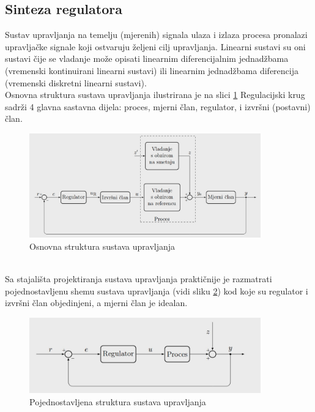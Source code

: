 \documentclass[times, utf8, diplomski]{fer}
\begin{document}
\subsection{Sinteza regulatora}
Sustav upravljanja na temelju (mjerenih) signala ulaza i izlaza procesa pronalazi upravljačke signale koji ostvaruju željeni cilj upravljanja. Linearni sustavi su oni sustavi čije se vladanje može opisati linearnim diferencijalnim jednadžbama (vremenski kontinuirani linearni sustavi) ili linearnim jednadžbama diferencija (vremenski diskretni linearni sustavi).\\
Osnovna struktura sustava upravljanja ilustrirana je na slici \ref{fig:Osnovna struktura} Regulacijski krug sadrži 4 glavna sastavna dijela: proces, mjerni član, regulator, i izvršni (postavni) član.
\begin{figure}[htb]
\centering
\includegraphics[width=10cm]{img/osnovnaReg.png}
\caption{Osnovna struktura sustava upravljanja\protect\footnotemark}
\label{fig:Osnovna struktura}
\end{figure}
\\
Sa stajališta projektiranja sustava upravljanja praktičnije je razmatrati pojednostavljenu shemu sustava upravljanja (vidi sliku \ref{fig:Pojednostavljena struktura}) kod koje su regulator i izvršni član objedinjeni, a mjerni član je idealan.
\begin{figure}[htb]
\centering
\includegraphics[width=10cm]{img/struktura.png}
\caption{Pojednostavljena struktura sustava upravljanja\protect\footnotemark}
\label{fig:Pojednostavljena struktura}
\end{figure}
\\
\end{document}
